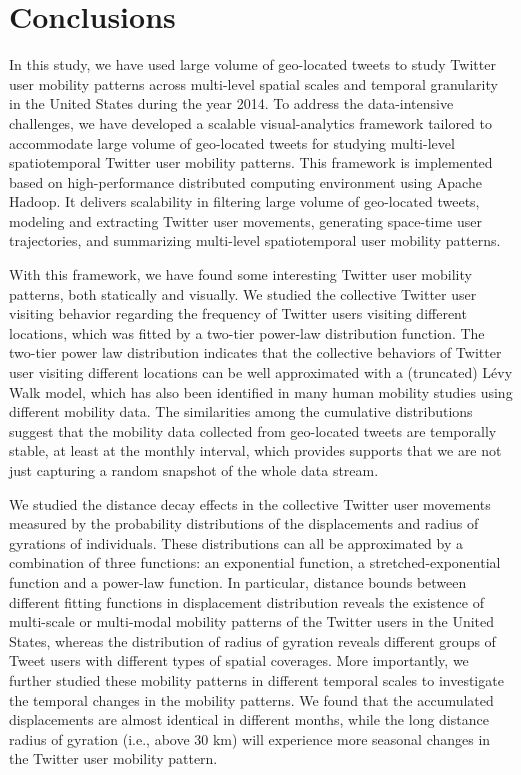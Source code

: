 \documentclass[a4paper, 11pt]{article}
\begin{document}
\section{Conclusions}
In this study, we have used large volume of geo-located tweets to study Twitter user mobility patterns across multi-level spatial scales and temporal granularity in the United States during the year 2014. 
To address the data-intensive challenges, we have developed a scalable visual-analytics framework tailored to accommodate large volume of geo-located tweets for studying multi-level spatiotemporal Twitter user mobility patterns.
This framework is implemented based on high-performance distributed computing environment using Apache Hadoop.
It delivers scalability in filtering large volume of geo-located tweets, modeling and extracting Twitter user movements, generating space-time user trajectories, and summarizing multi-level spatiotemporal user mobility patterns.

With this framework, we have found some interesting Twitter user mobility patterns, both statically and visually.
We studied the collective Twitter user visiting behavior regarding the frequency of Twitter users visiting different locations, which was fitted by a two-tier power-law distribution function.
The two-tier power law distribution indicates that the collective behaviors of Twitter user visiting different locations can be well approximated with a (truncated) L\'{e}vy Walk model, which has also been identified in many human mobility studies using different mobility data.
The similarities among the cumulative distributions suggest that the mobility data collected from geo-located tweets are temporally stable, at least at the monthly interval, which provides supports that we are not just capturing a random snapshot of the whole data stream. 

We studied the distance decay effects in the collective Twitter user movements measured by the probability distributions of the displacements and radius of gyrations of individuals. 
These distributions can all be approximated by a combination of three functions: an exponential function, a stretched-exponential function and a power-law function. In particular, distance bounds between different fitting functions in displacement distribution reveals the existence of multi-scale or multi-modal mobility patterns of the Twitter users in the United States, whereas the distribution of radius of gyration reveals different groups of Tweet users with different types of spatial coverages.   
More importantly, we further studied these mobility patterns in different temporal scales to investigate the temporal changes in the mobility patterns. 
We found that the accumulated displacements are almost identical in different months, while the long distance radius of gyration (i.e., above 30 km) will experience more seasonal changes in the Twitter user mobility pattern.



\cleardoublepage
%



\end{document}
